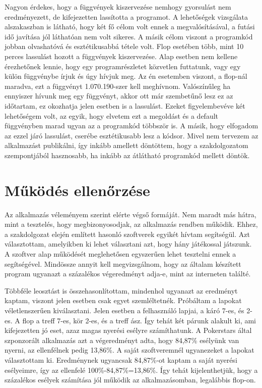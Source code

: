 Nagyon érdekes, hogy a függvények kiszervezése nemhogy gyorsulást nem eredményezett, de kifejezetten lassította a programot. A lehetőségek vizsgálata alszakaszban is látható, hogy két fő célom volt ennek a megvalósításával, a futási idő javítása jól láthatóan nem volt sikeres. A másik célom viszont a programkód jobban olvashatóvá és esztétikusabbá tétele volt. Flop esetében több, mint 10 perces lassulást hozott a függvények kiszervezése. Alap esetben nem kellene érezhetőnek lennie, hogy egy programrészletet közvetlen futtatunk, vagy egy külön függvénybe írjuk és úgy hívjuk meg. Az én esetemben viszont, a flop-nál maradva, ezt a függvényt 1.070.190-szer kell meghívnom. Valószínűleg ha ennyiszer hívunk meg egy függvényt, akkor ott már szembetűnő lesz ez az időtartam, ez okozhatja jelen esetben is a lassulást. Ezeket figyelembevéve két lehetőségem volt, az egyik, hogy elvetem ezt a megoldást és a default függvényben marad ugyan az a programkód többször is. A másik, hogy elfogadom az ezzel járó lassulást, cserébe esztétikusabb lesz a kódsor. Mivel nem tervezem az alkalmazást publikálni, így inkább amellett döntöttem, hogy a szakdolgozatom szempontjából hasznosabb, ha inkább az átlátható programkód mellett döntök.

\section{Működés ellenőrzése}
Az alkalmazás véleményem szerint elérte végső formáját. Nem maradt más hátra, mint a tesztelés, hogy megbizonyosodjak, az alkalmazás rendben működik. Ehhez, a szakdolgozat elején említett hasonló szoftverek egyikét hívtam segítségül. Azt választottam, amelyikben ki lehet választani azt, hogy hány játékossal játszunk. A szoftver alap működését meglehetősen egyszerűen lehet tesztelni ennek a segítségével. Mindössze annyit kell megvizsgálnom, hogy az általam készített program ugyanazt a százalékos végeredményt adja-e, mint az interneten találté.

Többféle leosztást is összehasonlítottam, mindenhol ugyanazt az eredményt kaptam, viszont jelen esetben csak egyet szemléltetnék. Próbáltam a lapokat véletlenszerűen kiválasztani. Jelen esetben a felhasználó lapjai, a káró 7-es, és 2-es. A flop a treff 7-es, kör 2-es, és a treff ász. Így tehát két párunk alakult ki, ami kifejezetten jó eset, azaz magas nyerési esélyre számíthatunk. A Pokerstars által szponzorált alkalmazás azt a végeredményt adta, hogy 84,87\% esélyünk van nyerni, az ellenfélnek pedig 13,86\%. A saját szoftveremnél ugyanezeket a lapokat választottam ki. Eredménynek ugyancsak 84,87\%-ot kaptam a saját nyerési esélyeimre, így az ellenfelé 100\%-84,87\%=13,86\%. Így tehát kijelenthetjük, hogy a százalékos esélyek számítása jól működik az alkalmazásomban, legalábbis flop-on.

